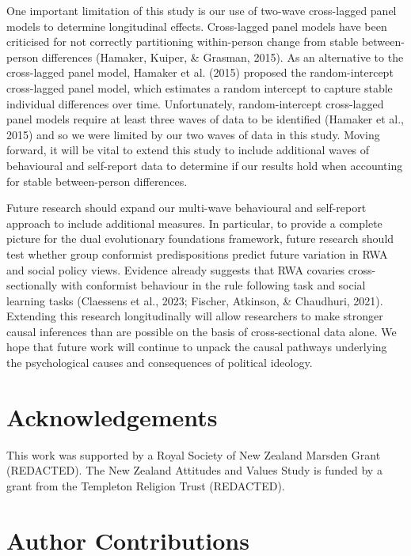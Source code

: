 \documentclass[
  man,floatsintext]{apa6}
\begin{document}
One important limitation of this study is our use of two-wave cross-lagged
panel models to determine longitudinal effects. Cross-lagged panel models have
been criticised for not correctly partitioning within-person change from stable
between-person differences (Hamaker, Kuiper, \& Grasman, 2015). As an alternative to the
cross-lagged panel model, Hamaker et al. (2015) proposed the random-intercept
cross-lagged panel model, which estimates a random intercept to capture stable
individual differences over time. Unfortunately, random-intercept cross-lagged
panel models require at least three waves of data to be identified
(Hamaker et al., 2015) and so we were limited by our two waves of data in this study.
Moving forward, it will be vital to extend this study to include additional
waves of behavioural and self-report data to determine if our results hold when
accounting for stable between-person differences.

Future research should expand our multi-wave behavioural and self-report
approach to include additional measures. In particular, to provide a complete
picture for the dual evolutionary foundations framework, future research should
test whether group conformist predispositions predict future variation in RWA
and social policy views. Evidence already suggests that RWA covaries
cross-sectionally with conformist behaviour in the rule following task and
social learning tasks (Claessens et al., 2023; Fischer, Atkinson, \& Chaudhuri, 2021). Extending this research
longitudinally will allow researchers to make stronger causal inferences than
are possible on the basis of cross-sectional data alone. We hope that future
work will continue to unpack the causal pathways underlying the psychological
causes and consequences of political ideology.

\newpage
\nolinenumbers

\hypertarget{acknowledgements}{%
\section{Acknowledgements}\label{acknowledgements}}

This work was supported by a Royal Society of New Zealand Marsden Grant
(REDACTED). The New Zealand Attitudes and Values Study is funded by a grant
from the Templeton Religion Trust (REDACTED).

\hypertarget{author-contributions}{%
\section{Author Contributions}\label{author-contributions}}
\end{document}
